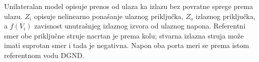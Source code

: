 Unilateralan model opisuje prenos od ulaza ka izlazu bez povratne sprege prema ulazu. $Z_i$ opisuje nelinearno ponašanje ulaznog priključka, $Z_o$ izlaznog priključka, a $f(V_i)$ zavisnost unutrašnjeg izlaznog izvora od ulaznog napona. Referentni smer obe priključne struje nacrtan je prema kolu; stvarna izlazna struja može imati suprotan smer i tada je negativna. Napon oba porta meri se prema istom referentnom vodu DGND.
